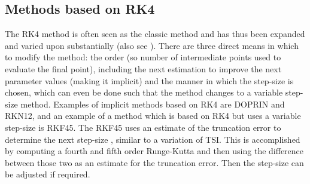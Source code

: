 \subsection{Methods based on \ac{RK4}}
\label{subsec:var_rk4}
The \ac{RK4} method is often seen as the classic method and has thus been expanded and varied upon substantially (also see ). There are three direct means in which to modify the method: the order (so number of intermediate points used to evaluate the final point), including the next estimation to improve the next parameter values (making it implicit) and the manner in which the step-size is chosen, which can even be done such that the method changes to a variable step-size method. Examples of implicit methods based on \ac{RK4} are DOPRIN and \ac{RKN12}, and an example of a method which is based on \ac{RK4} but uses a variable step-size is \ac{RKF45}. The \ac{RKF45} uses an estimate of the truncation error to determine the next step-size \cite{fehlberg1969}, similar to a variation of \ac{TSI}. This is accomplished by computing a fourth and fifth order Runge-Kutta and then using the difference between those two as an estimate for the truncation error. Then the step-size can be adjusted if required.








